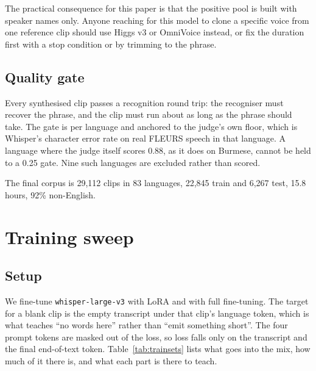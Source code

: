 \documentclass[preprint]{article}
\begin{document}
The practical consequence for this paper is that the positive pool is built with speaker names
only. Anyone reaching for this model to clone a specific voice from one reference clip should
use Higgs v3 or OmniVoice instead, or fix the duration first with a stop condition or by
trimming to the phrase.

\subsection{Quality gate}

Every synthesised clip passes a recognition round trip: the recogniser must recover the phrase,
and the clip must run about as long as the phrase should take. The gate is per language and
anchored to the judge's own floor, which is Whisper's character error rate on real FLEURS speech
in that language. A language where the judge itself scores 0.88, as it does on Burmese, cannot
be held to a 0.25 gate. Nine such languages are excluded rather than scored.

The final corpus is 29,112 clips in 83 languages, 22,845 train and 6,267 test, 15.8 hours, 92\%
non-English.

\section{Training sweep}
\label{sec:sweep}

\subsection{Setup}

We fine-tune \texttt{whisper-large-v3} with LoRA \citep{hu2021lora} and with full fine-tuning.
The target for a blank clip is the empty transcript under that clip's language token, which is
what teaches ``no words here'' rather than ``emit something short''. The four prompt tokens are
masked out of the loss, so loss falls only on the transcript and the final end-of-text
token. Table~\ref{tab:trainsets} lists what goes into the mix, how much of it there is, and
what each part is there to teach.
\end{document}
